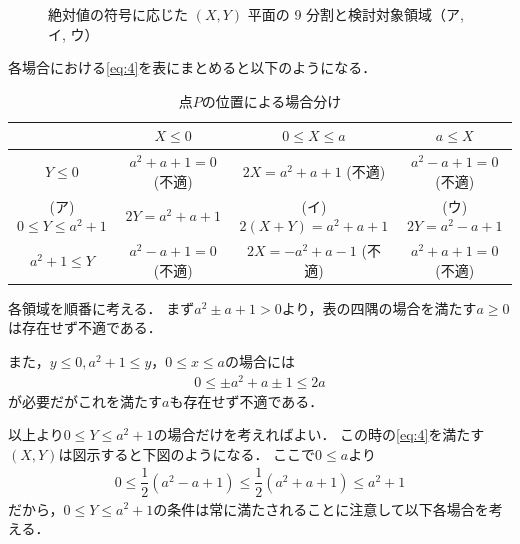 \documentclass[../../main.tex]{subfiles}
\begin{document}
\begin{figure}[htb]
  \caption{絶対値の符号に応じた $(X,Y)$ 平面の 9 分割と検討対象領域（ア, イ, ウ）}
  \label{fig:xy_nine_regions_split}
\end{figure}

各場合における\cref{eq:4}を表にまとめると以下のようになる．

\begin{table}[htb]
  \centering
  \renewcommand{\arraystretch}{1.6}
  \begin{tabular}{c|c|c|c}
    & $X\le0$ & $0\le X\le a$ & $a\le X$ \\ \hline
    $Y\le0$ & $a^2+a+1=0$ (不適) & $2X=a^2+a+1$ (不適) & $a^2-a+1=0$ (不適) \\ \hline
    (ア) $0\le Y\le a^2+1$ & $2Y=a^2+a+1$ & (イ) $2(X+Y)=a^2+a+1$ & (ウ) $2Y=a^2-a+1$ \\ \hline
    $a^2+1\le Y$ & $a^2-a+1=0$ (不適) & $2X=-a^2+a-1$ (不適) & $a^2+a+1=0$ (不適)
  \end{tabular}
  \caption{点$P$の位置による場合分け}
\end{table}

各領域を順番に考える．
まず$a^2\pm a+1>0$より，表の四隅の場合を満たす$a\ge 0$は存在せず不適である．

また，$y\le0, a^2+1 \le y$，$0\le x\le a$の場合には
\begin{align}
  0\le \pm a^2+a \pm 1 \le 2a
\end{align}
が必要だがこれを満たす$a$も存在せず不適である．

以上より$0\le Y\le a^2+1$の場合だけを考えればよい．
この時の\cref{eq:4}を満たす$(X,Y)$は図示すると下図のようになる．
ここで$0 \le a$より
\begin{align}
  0 \le \dfrac{1}{2}\left(a^2-a+1\right) \le \dfrac{1}{2}\left(a^2+a+1\right) \le a^2+1
\end{align}
だから，$0\le Y\le a^2+1$の条件は常に満たされることに注意して以下各場合を考える．
\end{document}
